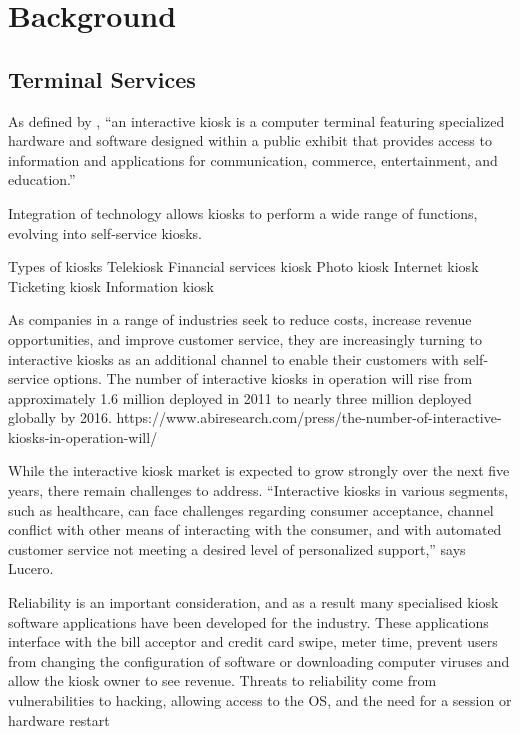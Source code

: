 \chapter{Background}
\label{sec:back}



\section{Terminal Services}


As defined by \cite{satish2012money}, ``an interactive kiosk is a computer terminal featuring specialized hardware and software designed within a public exhibit that provides access to information and applications for communication, commerce, entertainment, and education.''

Integration of technology allows kiosks to perform a wide range of functions, evolving into self-service kiosks.

Types of kiosks
Telekiosk
Financial services kiosk
Photo kiosk
Internet kiosk
Ticketing kiosk
Information kiosk


As companies in a range of industries seek to reduce costs, increase revenue opportunities, and improve customer service, they are increasingly turning to interactive kiosks as an additional channel to enable their customers with self-service options. 
The number of interactive kiosks in operation will rise from approximately 1.6 million deployed in 2011 to nearly three million deployed globally by 2016.
https://www.abiresearch.com/press/the-number-of-interactive-kiosks-in-operation-will/


While the interactive kiosk market is expected to grow strongly over the next five years, there remain challenges to address.  “Interactive kiosks in various segments, such as healthcare, can face challenges regarding consumer acceptance, channel conflict with other means of interacting with the consumer, and with automated customer service not meeting a desired level of personalized support,” says Lucero. 


Reliability is an important consideration, and as a result many specialised kiosk software applications have been developed for the industry. These applications interface with the bill acceptor and credit card swipe, meter time, prevent users from changing the configuration of software or downloading computer viruses and allow the kiosk owner to see revenue. Threats to reliability come from vulnerabilities to hacking, allowing access to the OS, and the need for a session or hardware restart


